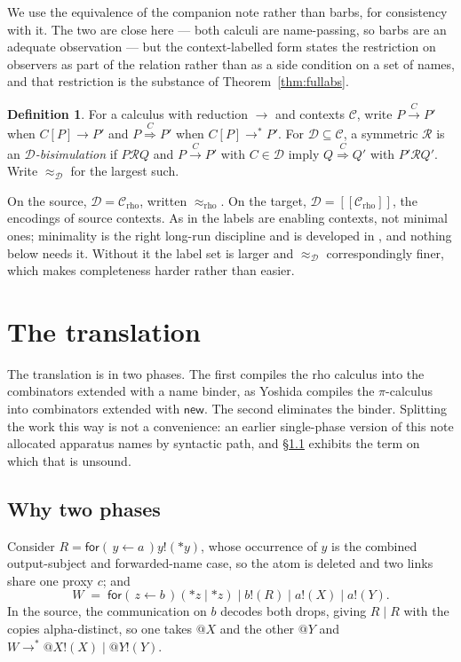\documentclass[11pt]{article}
\makeatletter
\theoremstyle{plain}
\theoremstyle{definition}
\newtheorem{definition}[theorem]{Definition}
\theoremstyle{remark}
\newcommand{\quo}[1]{@#1}
\newcommand{\drp}[1]{{*}#1}
\newcommand{\inp}[3]{\mathsf{for}(\,#1 \leftarrow #2\,)#3}
\newcommand{\out}[2]{#1!(#2)}
\newcommand{\enc}[1]{[\![#1]\!]}
\newcommand{\Ctx}{\mathscr{C}}
\newcommand{\Obs}{\mathcal{D}}
\newcommand{\bisim}{\approx}
\providecommand{\xLongrightarrow}[1]{\mathrel{\overset{#1}{\Longrightarrow}}}
\newcommand{\red}{\longrightarrow}
\newcommand{\wred}{\longrightarrow^{*}}
\makeatother
\begin{document}
We use the equivalence of the companion note \cite{nowns} rather than barbs,
for consistency with it. The two are close here --- both calculi are
name-passing, so barbs are an adequate observation --- but the context-labelled
form states the restriction on observers as part of the relation rather than
as a side condition on a set of names, and that restriction is the substance
of Theorem~\ref{thm:fullabs}.

\begin{definition}
\label{def:clb}
For a calculus with reduction $\red$ and contexts $\Ctx$, write
$P \xrightarrow{\,C\,} P'$ when $C[P] \red P'$ and
$P \xLongrightarrow{\,C\,} P'$ when $C[P] \wred P'$. For
$\Obs \subseteq \Ctx$, a symmetric $\mathcal{R}$ is an
\emph{$\Obs$-bisimulation} if $P \mathrel{\mathcal{R}} Q$ and
$P \xrightarrow{\,C\,} P'$ with $C \in \Obs$ imply
$Q \xLongrightarrow{\,C\,} Q'$ with $P' \mathrel{\mathcal{R}} Q'$. Write
$\bisim_{\Obs}$ for the largest such.
\end{definition}

On the source, $\Obs = \Ctx_{\mathrm{rho}}$, written $\bisim_{\mathrm{rho}}$.
On the target, $\Obs = \enc{\Ctx_{\mathrm{rho}}}$, the encodings of source
contexts. As in \cite{nowns} the labels are enabling contexts, not minimal
ones; minimality is the right long-run discipline and is developed in
\cite{BIHOL}, and nothing below needs it. Without it the label set is larger
and $\bisim_{\Obs}$ correspondingly finer, which makes completeness harder
rather than easier.

\section{The translation}
\label{sec:translation}

The translation is in two phases. The first compiles the rho calculus into
the combinators extended with a name binder, as Yoshida compiles the
$\pi$-calculus into combinators extended with $\mathsf{new}$. The second
eliminates the binder. Splitting the work this way is not a convenience: an
earlier single-phase version of this note allocated apparatus names by
syntactic path, and \S\ref{sec:whyphases} exhibits the term on which that is
unsound.

\subsection{Why two phases}
\label{sec:whyphases}

Consider $R = \inp{y}{a}{\out{y}{\drp{y}}}$, whose occurrence of $y$ is the
combined output-subject and forwarded-name case, so the atom is deleted and
two links share one proxy $c$; and
\[
  W \;=\; \inp{z}{b}{(\drp{z} \mid \drp{z})} \mid \out{b}{R}
      \mid \out{a}{X} \mid \out{a}{Y}.
\]
In the source, the communication on $b$ decodes both drops, giving
$R \mid R$ with the copies alpha-distinct, so one takes $\quo{X}$ and the
other $\quo{Y}$ and $W \wred \out{\quo{X}}{X} \mid \out{\quo{Y}}{Y}$.
\end{document}
